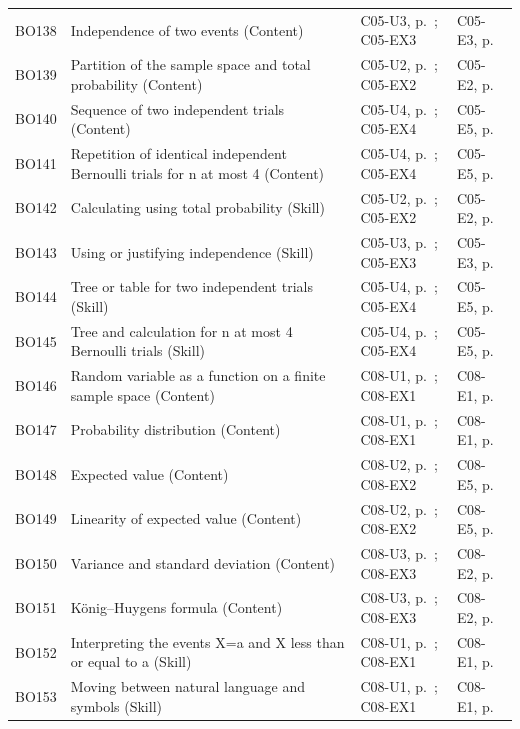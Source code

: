 \begin{longtable}{p{.1\linewidth}p{.43\linewidth}p{.19\linewidth}p{.16\linewidth}}
BO138 & Independence of two events (Content) & C05-U3, p.\,\pageref{C05-U3} ; C05-EX3 & C05-E3, p.\,\pageref{C05-E3} \\
BO139 & Partition of the sample space and total probability (Content) & C05-U2, p.\,\pageref{C05-U2} ; C05-EX2 & C05-E2, p.\,\pageref{C05-E2} \\
BO140 & Sequence of two independent trials (Content) & C05-U4, p.\,\pageref{C05-U4} ; C05-EX4 & C05-E5, p.\,\pageref{C05-E5} \\
BO141 & Repetition of identical independent Bernoulli trials for n at most 4 (Content) & C05-U4, p.\,\pageref{C05-U4} ; C05-EX4 & C05-E5, p.\,\pageref{C05-E5} \\
BO142 & Calculating using total probability (Skill) & C05-U2, p.\,\pageref{C05-U2} ; C05-EX2 & C05-E2, p.\,\pageref{C05-E2} \\
BO143 & Using or justifying independence (Skill) & C05-U3, p.\,\pageref{C05-U3} ; C05-EX3 & C05-E3, p.\,\pageref{C05-E3} \\
BO144 & Tree or table for two independent trials (Skill) & C05-U4, p.\,\pageref{C05-U4} ; C05-EX4 & C05-E5, p.\,\pageref{C05-E5} \\
BO145 & Tree and calculation for n at most 4 Bernoulli trials (Skill) & C05-U4, p.\,\pageref{C05-U4} ; C05-EX4 & C05-E5, p.\,\pageref{C05-E5} \\
BO146 & Random variable as a function on a finite sample space (Content) & C08-U1, p.\,\pageref{C08-U1} ; C08-EX1 & C08-E1, p.\,\pageref{C08-E1} \\
BO147 & Probability distribution (Content) & C08-U1, p.\,\pageref{C08-U1} ; C08-EX1 & C08-E1, p.\,\pageref{C08-E1} \\
BO148 & Expected value (Content) & C08-U2, p.\,\pageref{C08-U2} ; C08-EX2 & C08-E5, p.\,\pageref{C08-E5} \\
BO149 & Linearity of expected value (Content) & C08-U2, p.\,\pageref{C08-U2} ; C08-EX2 & C08-E5, p.\,\pageref{C08-E5} \\
BO150 & Variance and standard deviation (Content) & C08-U3, p.\,\pageref{C08-U3} ; C08-EX3 & C08-E2, p.\,\pageref{C08-E2} \\
BO151 & König–Huygens formula (Content) & C08-U3, p.\,\pageref{C08-U3} ; C08-EX3 & C08-E2, p.\,\pageref{C08-E2} \\
BO152 & Interpreting the events X=a and X less than or equal to a (Skill) & C08-U1, p.\,\pageref{C08-U1} ; C08-EX1 & C08-E1, p.\,\pageref{C08-E1} \\
BO153 & Moving between natural language and symbols (Skill) & C08-U1, p.\,\pageref{C08-U1} ; C08-EX1 & C08-E1, p.\,\pageref{C08-E1} \\

\end{longtable}
